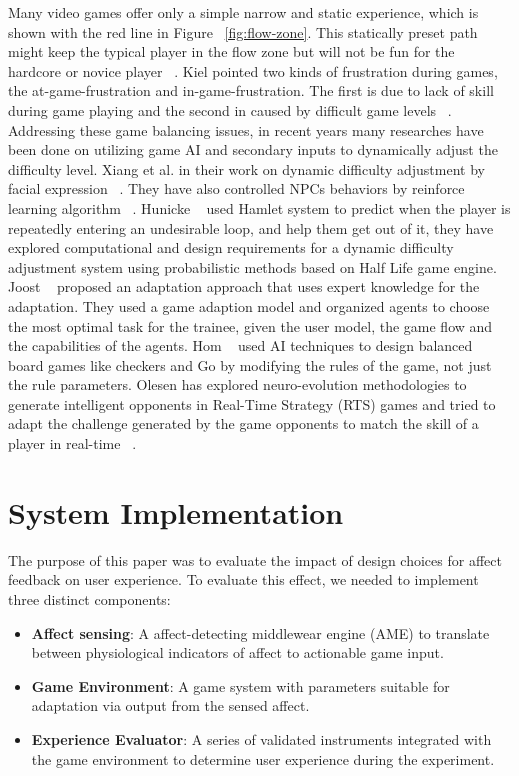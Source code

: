 \documentclass[conference]{IEEEtran}
\begin{document}
Many video games offer only a simple narrow and static experience, which is shown with the red line in Figure ~\ref{fig:flow-zone}. This statically preset path might keep the typical player in the flow zone but will not be fun for the hardcore or novice player ~\cite{chen2007flow}. Kiel pointed two kinds of frustration during games, the at-game-frustration and in-game-frustration. The first is due to lack of skill during game playing and the second in caused by difficult game levels ~\cite{gilleade2004using}. Addressing these game balancing issues, in recent years many researches have been done on utilizing game AI and secondary inputs to dynamically adjust the difficulty level. Xiang et al. in their work on dynamic difficulty adjustment by facial expression ~\cite{xiang2013dynamic}. They have also controlled NPCs behaviors by reinforce learning algorithm ~\cite{spronck2004difficulty, andrade2005challenge}. Hunicke ~\cite{hunicke2004ai} used Hamlet system to predict when the player is repeatedly entering an undesirable loop, and help them get out of it, they have explored computational and design requirements for a dynamic difficulty adjustment system using probabilistic methods based on Half Life game engine. Joost ~\cite{westra2009adaptive} proposed an adaptation approach that uses expert knowledge for the adaptation. They used a game adaption model and organized agents to choose the most optimal task for the trainee, given the user model, the game flow and the capabilities of the agents. Hom ~\cite{hom2007automatic} used AI techniques to design balanced board games like checkers and Go by modifying the rules of the game, not just the rule parameters. Olesen has explored neuro-evolution methodologies to generate intelligent opponents in Real-Time Strategy (RTS) games and tried to adapt the challenge generated by the game opponents to match the skill of a player in real-time ~\cite{olesen2008real}.


\section{System Implementation}
\label{sec:impl}

The purpose of this paper was to evaluate the impact of design choices for affect feedback on user experience. To evaluate this effect, we needed to implement three distinct components:
\begin{itemize}
\item {\bf Affect sensing}: A affect-detecting middlewear engine (AME) to translate between physiological indicators of affect to actionable game input.
\item {\bf Game Environment}: A game system with parameters suitable for adaptation via output from the sensed affect.
\item {\bf Experience Evaluator}: A series of validated instruments integrated with the game environment to determine user experience during the experiment.
\end{itemize}
\end{document}
